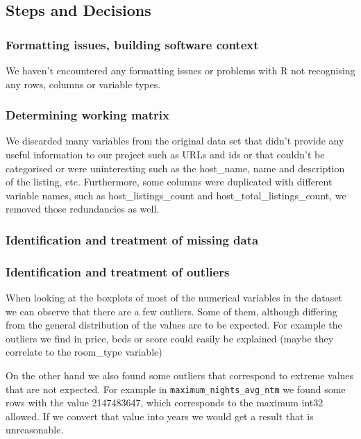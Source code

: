 
\subsection{Steps and Decisions}%
\label{sub:steps-decisions}

\subsubsection{Formatting issues, building software context}
We haven't encountered any formatting issues or problems with R
not recognising any rows, columns or variable types.

\subsubsection{Determining working matrix}
We discarded many variables from the original data set that didn't 
provide any useful information to our project such as URLs and ids or that couldn't be 
categorised or were uninteresting such as the host\_name, name 
and description of the listing, etc. Furthermore, some columns were duplicated with
different variable names, such as host\_listings\_count and 
host\_total\_listings\_count, we removed those redundancies as well.

\subsubsection{Identification and treatment of missing data}

\subsubsection{Identification and treatment of outliers}
When looking at the boxplots of most of the numerical variables in the dataset we can observe
that there are a few outliers. Some of them, although differing from the general 
distribution of the values are to be expected. For example the outliers we find in price,
beds or score could easily be explained (maybe they correlate to the room\_type variable)

On the other hand we also found some outliers that correspond to extreme values that are not
expected. For example in \texttt{maximum\_nights\_avg\_ntm} we found some rows with the value 2147483647,
which corresponds to the maximum int32 allowed. If we convert that value into years we would get a result 
that is unreasonable. 


